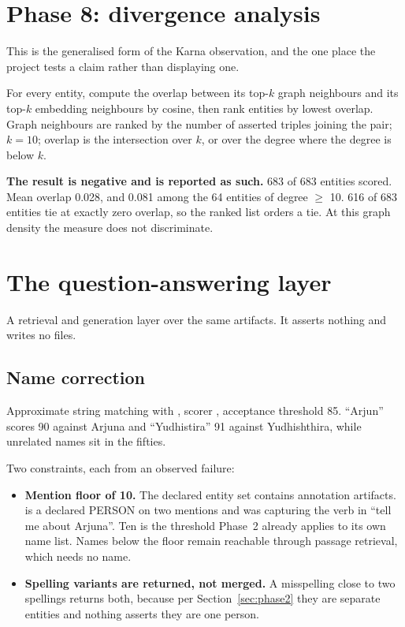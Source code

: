 \documentclass[11pt,a4paper]{article}
\newcommand{\pred}[1]{\texttt{\detokenize{#1}}}
\begin{document}
\section{Phase 8: divergence analysis}

This is the generalised form of the Karna observation, and the one place the
project tests a claim rather than displaying one.

For every entity, compute the overlap between its top-$k$ graph neighbours and
its top-$k$ embedding neighbours by cosine, then rank entities by lowest
overlap. Graph neighbours are ranked by the number of asserted triples joining
the pair; $k=10$; overlap is the intersection over $k$, or over the degree where
the degree is below $k$.

\textbf{The result is negative and is reported as such.} 683 of 683 entities
scored. Mean overlap 0.028, and 0.081 among the 64 entities of degree $\geq$ 10.
616 of 683 entities tie at exactly zero overlap, so the ranked list orders a
tie. At this graph density the measure does not discriminate.

\section{The question-answering layer}

A retrieval and generation layer over the same artifacts. It asserts nothing and
writes no files.

\subsection{Name correction}

Approximate string matching with \pred{rapidfuzz}, scorer \pred{WRatio},
acceptance threshold 85. ``Arjun'' scores 90 against Arjuna and ``Yudhistira''
91 against Yudhishthira, while unrelated names sit in the fifties.

Two constraints, each from an observed failure:

\begin{itemize}
\item \textbf{Mention floor of 10.} The declared entity set contains annotation
artifacts. \pred{Tell} is a declared PERSON on two mentions and was capturing
the verb in ``tell me about Arjuna''. Ten is the threshold Phase~2 already
applies to its own name list. Names below the floor remain reachable through
passage retrieval, which needs no name.

\item \textbf{Spelling variants are returned, not merged.} A misspelling close
to two spellings returns both, because per Section~\ref{sec:phase2} they are
separate entities and nothing asserts they are one person.
\end{itemize}
\end{document}
